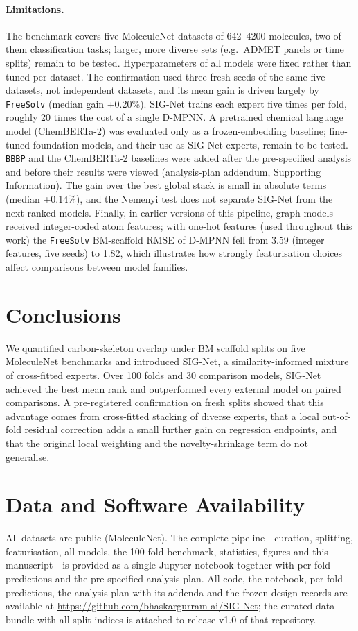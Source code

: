 \documentclass[journal=jcisd8,manuscript=article]{achemso}
\begin{document}
\paragraph{Limitations.}
The benchmark covers five MoleculeNet datasets of 642--4200 molecules, two of them classification tasks; larger, more diverse sets (e.g.\ ADMET panels or time splits\cite{sheridan2013timesplit}) remain to be tested. Hyperparameters of all models were fixed rather than tuned per dataset. The confirmation used three fresh seeds of the same five datasets, not independent datasets, and its mean gain is driven largely by \texttt{FreeSolv} (median gain +0.20\%). SIG-Net trains each expert five times per fold, roughly 20 times the cost of a single D-MPNN. A pretrained chemical language model (ChemBERTa-2) was evaluated only as a frozen-embedding baseline; fine-tuned foundation models, and their use as SIG-Net experts, remain to be tested. \texttt{BBBP} and the ChemBERTa-2 baselines were added after the pre-specified analysis and before their results were viewed (analysis-plan addendum, Supporting Information). The gain over the best global stack is small in absolute terms (median +0.14\%), and the Nemenyi test does not separate SIG-Net from the next-ranked models. Finally, in earlier versions of this pipeline, graph models received integer-coded atom features; with one-hot features (used throughout this work) the \texttt{FreeSolv} BM-scaffold RMSE of D-MPNN fell from 3.59 (integer features, five seeds) to 1.82, which illustrates how strongly featurisation choices affect comparisons between model families.

\section{Conclusions}
We quantified carbon-skeleton overlap under BM scaffold splits on five MoleculeNet benchmarks and introduced SIG-Net, a similarity-informed mixture of cross-fitted experts. Over 100 folds and 30 comparison models, SIG-Net achieved the best mean rank and outperformed every external model on paired comparisons. A pre-registered confirmation on fresh splits showed that this advantage comes from cross-fitted stacking of diverse experts, that a local out-of-fold residual correction adds a small further gain on regression endpoints, and that the original local weighting and the novelty-shrinkage term do not generalise.

\section{Data and Software Availability}
All datasets are public (MoleculeNet). The complete pipeline---curation, splitting, featurisation, all models, the 100-fold benchmark, statistics, figures and this manuscript---is provided as a single Jupyter notebook together with per-fold predictions and the pre-specified analysis plan. All code, the notebook, per-fold predictions, the analysis plan with its addenda and the frozen-design records are available at \url{https://github.com/bhaskargurram-ai/SIG-Net}; the curated data bundle with all split indices is attached to release v1.0 of that repository.
\end{document}
